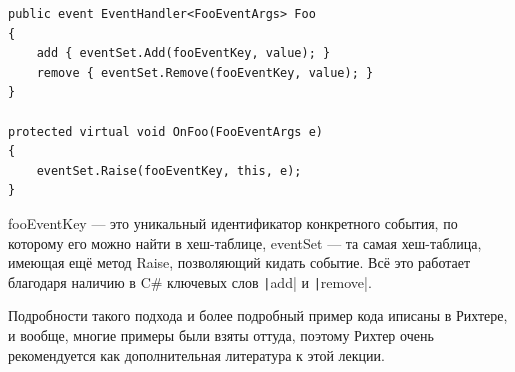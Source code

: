 \documentclass[a5paper]{article}
\begin{document}
\begin{verbatim}
public event EventHandler<FooEventArgs> Foo 
{
    add { eventSet.Add(fooEventKey, value); }
    remove { eventSet.Remove(fooEventKey, value); }
}

protected virtual void OnFoo(FooEventArgs e) 
{
    eventSet.Raise(fooEventKey, this, e);
}
\end{verbatim}

fooEventKey --- это уникальный идентификатор конкретного события, по которому его можно найти в хеш-таблице, eventSet --- та самая хеш-таблица, имеющая ещё метод Raise, позволяющий кидать событие. Всё это работает благодаря наличию в C\# ключевых слов \texttt|add| и \texttt|remove|.

Подробности такого подхода и более подробный пример кода иписаны в Рихтере, и вообще, многие примеры были взяты оттуда, поэтому Рихтер очень рекомендуется как дополнительная литература к этой лекции.
\end{document}
